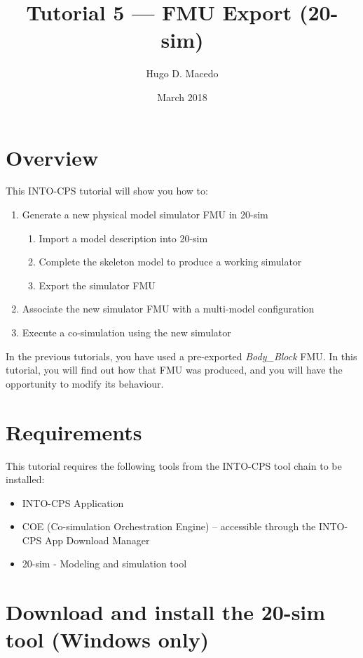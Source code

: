 \documentclass[11pt,a4paper]{../tutorial}
\title{Tutorial 5 --- FMU Export (20-sim)}
\date{March 2018}
\author{Hugo D. Macedo}
\begin{document}
\section*{Overview}

This INTO-CPS tutorial will show you how to:

\begin{enumerate}[noitemsep]
\item Generate a new physical model simulator FMU in 20-sim
    \begin{enumerate}[noitemsep]
        \item Import a model description into 20-sim
        \item Complete the skeleton model to produce a working simulator
        \item Export the simulator FMU
    \end{enumerate}
\item Associate the new simulator FMU with a multi-model configuration
\item Execute a co-simulation using the new simulator
\end{enumerate}

In the previous tutorials, you have used a pre-exported \emph{Body\_Block} FMU.
In this tutorial, you will find out how that FMU was produced, and you will have the opportunity to modify its behaviour.

\section*{Requirements}

This tutorial requires the following tools from the INTO-CPS tool chain to be installed:

\begin{itemize}[noitemsep]
\item INTO-CPS Application
\item COE (Co-simulation Orchestration Engine) -- accessible through the INTO-CPS App Download Manager
\item 20-sim - Modeling and simulation tool 
\end{itemize}

\section{Download and install the 20-sim tool (Windows only)}
\end{document}
